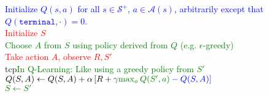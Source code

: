 \documentclass{standalone}
\begin{document}
\pagestyle{empty}
\begin{algorithm}[H]
  \KwInput{Step size $\alpha \in (0, 1]$, and a small $\epsilon > 0$.}
  \textcolor{blue}{Initialize $Q(s,a)$ for all $s \in \mathcal S^+$, $a \in \mathcal A(s)$,   arbitrarily except that $Q(\texttt{terminal}, \cdot) = 0$.\\}
 {
  \textcolor{red}{Initialize $S$} \\
   {
\textcolor{Green}{Choose $A$ from $S$ using policy derived from $Q$ (e.g. $\epsilon$-greedy)} \\
\textcolor{red}{Take action $A$, observe $R, S'$ \\}
tcp{\textcolor{Green}{In Q-Learning: Like using a greedy policy from $S'$}}
\textcolor{blue}{
    $Q(S,A) \gets Q(S,A) + \alpha \left[R + \gamma \color{Green}{\max_a Q(S', a)} \color{blue} -       Q(S,A)\right]$ \\}
    \textcolor{Green}{$S \gets S'$} 
  }
}
\end{algorithm}
\end{document}

